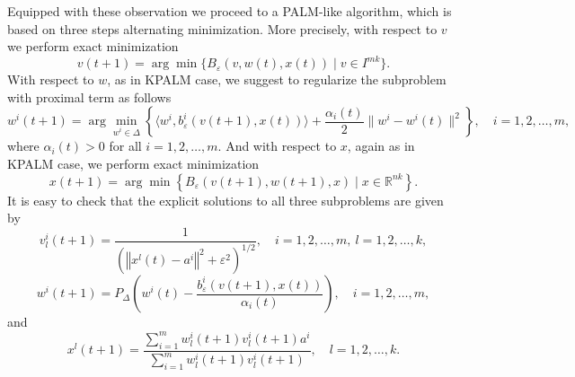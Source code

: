 \documentclass[11pt]{article}
\numberwithin{equation}{section}
\newcommand{\norm}[1]{\left\Vert {#1} \right\Vert} %
\begin{document}
Equipped with these observation we proceed to a PALM-like algorithm, which is based on three steps alternating minimization. More precisely, with respect to $v$ we perform exact minimization
\begin{equation}
	v(t+1) = \arg\!\min \{ B_{\varepsilon}(v,w(t),x(t)) \mid v \in I^{mk} \} . \label{v_step}
\end{equation}
With respect to $w$, as in KPALM case, we suggest to regularize the subproblem with proximal term as follows
\begin{equation}
	w^i(t+1) = \arg\!\min\limits_{w^i \in \Delta} \left\lbrace \langle w^i , b^i_{\varepsilon}(v(t+1),x(t)) \rangle + \frac{\alpha_i(t)}{2} \|w^i - w^i(t)\|^2 \right\rbrace, \quad i=1,2, \ldots, m , \label{w_step}
\end{equation}
where $\alpha_i(t) > 0$ for all $i=1,2, \ldots, m$. And with respect to $x$, again as in KPALM case, we perform exact minimization
\begin{equation}
	x(t+1) = \arg\!\min \left\lbrace B_{\varepsilon}(v(t+1), w(t+1), x) \mid x \in \mathbb{R}^{nk} \right\rbrace . \label{x_step}
\end{equation}
It is easy to check that the explicit solutions to all three subproblems are given by
\begin{equation}
	v^i_l(t+1) = \frac{1}{\left(\norm{x^l(t)-a^i}^2 + {\varepsilon}^2 \right)^{1/2}}, \quad i=1,2,\ldots,m, \: l=1,2,\ldots,k , \label{v_step_sol}
\end{equation}
\begin{equation}
	w^i(t+1) = P_{\Delta}\left( w^i(t) - \frac{b^i_{\varepsilon}(v(t+1),x(t))}{\alpha_i(t)} \right), \quad i=1,2,\ldots,m , \label{w_step_sol}
\end{equation}
and
\begin{equation}
	x^l(t+1) = \frac{\sum_{i=1}^{m} w^i_l(t+1)v^i_l(t+1)a^i}{\sum_{i=1}^{m} w^i_l(t+1)v^i_l(t+1)}, \quad l=1,2,\ldots,k . \label{x_step_sol}
\end{equation}
\end{document}
